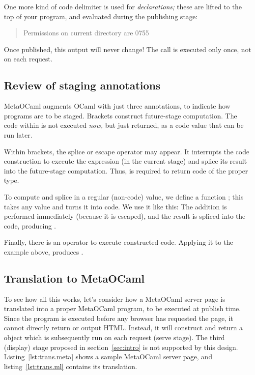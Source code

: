 \documentclass[preprint]{acm_proc_article-sp}
\def\MOC{MetaOCaml\xspace}
\newcounter{listing}
\begin{document}
One more kind of code delimiter is used for \emph{declarations;}
these are lifted to the top of your program, and evaluated during
the publishing stage:
\begin{quote}
Permissions on current directory are 0755
\end{quote}

Once published, this output will never change!  The 
call is executed only once, not on each request.

\subsection{Review of staging annotations}

\MOC augments OCaml with just three annotations, to indicate how
programs are to be staged.  Brackets  construct future-stage computation.  The code within
is not executed \emph{now,} but just returned, as a code value that can be
run later.  

Within brackets, the splice or escape operator  may
appear.  It interrupts the code construction to execute the expression
 (in the current stage) and splice its result into the
future-stage computation.  Thus,  is required to return code of
the proper type.

To compute and splice in a regular (non-code) value, we define a
function ; this
takes any value and turns it into code.  We use it like this:
 The addition is
performed immediately (because it is escaped), and the result is
spliced into the code, producing .

Finally, there is an operator \Mrun{} to execute constructed code.
Applying it to the example above,  produces .


\subsection{Translation to \MOC}
To see how all this works, let's consider how a \MOC server
page is translated into a proper \MOC program, to be executed
at publish time.  Since the program is executed before any
browser has requested the page, it cannot directly return or
output HTML.  Instead, it will construct and return a 
object which is subsequently run on each request (serve stage).
The third (display) stage proposed in section~\ref{sec:intro} is not
supported by this design.
Listing~\ref{lst:trans.meta} shows a sample \MOC server page,
and listing~\ref{lst:trans.ml} contains its translation.
\end{document}

